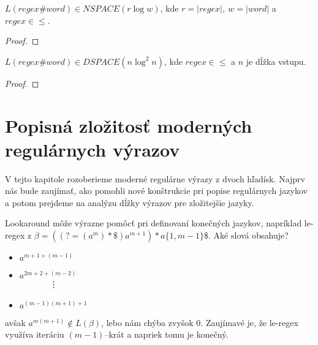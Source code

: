 \begin{veta}
$L(regex\#word) \in NSPACE(r \log w)$, kde $r = |regex|,~w = |word|$ a $regex \in \le$.
\end{veta}
\begin{proof}
\TODO
\end{proof}

\begin{veta}
$L(regex\#word) \in DSPACE(n \log^2 n)$, kde $regex \in \le$ a $n$ je dĺžka vstupu.
\end{veta}
\begin{proof}
\TODO
\end{proof}


\section[Popisná zložitosť]{Popisná zložitosť moderných regulárnych výrazov}
\label{vzlozitost}

V tejto kapitole rozoberieme moderné regulárne výrazy z dvoch hľadísk. Najprv nás bude zaujímať, ako pomohli nové konštrukcie pri popise regulárnych jazykov a potom prejdeme na analýzu dĺžky výrazov pre zložitejšie jazyky.

Lookaround môže výrazne pomôcť pri definovaní konečných jazykov, napríklad le-regex z \cite[Poznámka 1.]{mojaBak}
$\beta = ((?=(a^m)*\mathdollar )a^{m+1})*a \lbrace 1,m-1 \rbrace \mathdollar$. Aké slová obsahuje?
\begin{itemize}
\item $a^{m+1+(m-1)}$
\item $a^{2m+2+(m-2)}$ \\
	  ~~~~~~~\vdots
\item $a^{(m-1)(m+1)+1}$
\end{itemize}
avšak $a^{m(m+1)} \notin L(\beta )$, lebo nám chýba zvyšok $0$. Zaujímavé je, že le-regex využíva iteráciu $(m-1)$--krát a napriek tomu je konečný.
